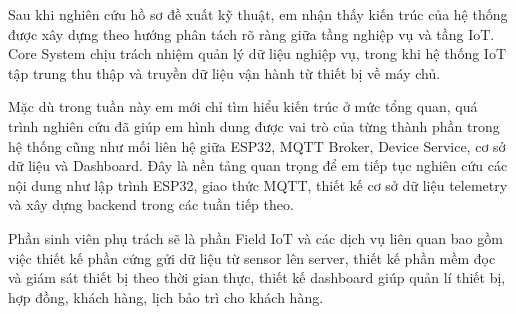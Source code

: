 
Sau khi nghiên cứu hồ sơ đề xuất kỹ thuật, em nhận thấy kiến trúc của hệ thống được xây dựng theo hướng phân tách rõ ràng giữa tầng nghiệp vụ và tầng IoT. Core System chịu trách nhiệm quản lý dữ liệu nghiệp vụ, trong khi hệ thống IoT tập trung thu thập và truyền dữ liệu vận hành từ thiết bị về máy chủ.

Mặc dù trong tuần này em mới chỉ tìm hiểu kiến trúc ở mức tổng quan, quá trình nghiên cứu đã giúp em hình dung được vai trò của từng thành phần trong hệ thống cũng như mối liên hệ giữa ESP32, MQTT Broker, Device Service, cơ sở dữ liệu và Dashboard. Đây là nền tảng quan trọng để em tiếp tục nghiên cứu các nội dung như lập trình ESP32, giao thức MQTT, thiết kế cơ sở dữ liệu telemetry và xây dựng backend trong các tuần tiếp theo.

Phần sinh viên phụ trách sẽ là phần Field IoT và các dịch vụ liên quan bao gồm việc thiết kế phần cứng gửi dữ liệu từ sensor lên server, thiết kế phần mềm đọc và giám sát thiết bị theo thời gian thực, thiết kế dashboard giúp quản lí thiết bị, hợp đồng, khách hàng, lịch bảo trì cho khách hàng.
